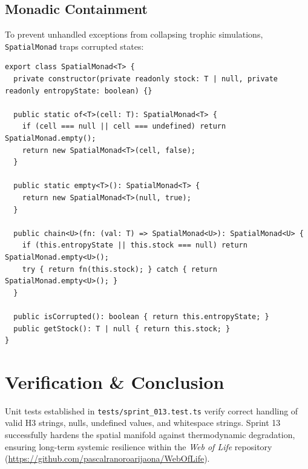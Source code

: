 \documentclass[11pt, a4paper]{article}
\begin{document}
\subsection{Monadic Containment}
To prevent unhandled exceptions from collapsing trophic simulations, \texttt{SpatialMonad} traps corrupted states:
\begin{verbatim}
export class SpatialMonad<T> {
  private constructor(private readonly stock: T | null, private readonly entropyState: boolean) {}

  public static of<T>(cell: T): SpatialMonad<T> {
    if (cell === null || cell === undefined) return SpatialMonad.empty();
    return new SpatialMonad<T>(cell, false);
  }

  public static empty<T>(): SpatialMonad<T> {
    return new SpatialMonad<T>(null, true);
  }

  public chain<U>(fn: (val: T) => SpatialMonad<U>): SpatialMonad<U> {
    if (this.entropyState || this.stock === null) return SpatialMonad.empty<U>();
    try { return fn(this.stock); } catch { return SpatialMonad.empty<U>(); }
  }

  public isCorrupted(): boolean { return this.entropyState; }
  public getStock(): T | null { return this.stock; }
}
\end{verbatim}

\section{Verification \& Conclusion}
Unit tests established in \texttt{tests/sprint\_013.test.ts} verify correct handling of valid H3 strings, nulls, undefined values, and whitespace strings. Sprint 13 successfully hardens the spatial manifold against thermodynamic degradation, ensuring long-term systemic resilience within the \emph{Web of Life} repository (\url{https://github.com/pascalranoroarijaona/WebOfLife}).
\end{document}
